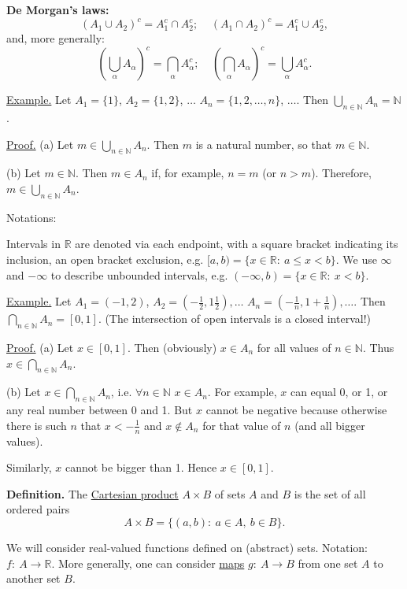 \documentclass[a4paper,10pt]{article}
\def\NN{\mathbb{N}}
\def\RR{\mathbb{R}}
\newcommand{\1}[1]{\mathbf{1}_{\{#1\}}}
\begin{document}
{\bf De Morgan's laws:}
  $$(A_1\cup A_2)^c=A^c_1\cap A^c_2;~~~~~(A_1\cap A_2)^c=A^c_1\cup A^c_2,$$
and, more generally:
  $$\left(\bigcup_\alpha A_\alpha\right)^c=\bigcap_\alpha A^c_\alpha;~~~~~\left(\bigcap_\alpha A_\alpha\right)^c=\bigcup_\alpha A^c_\alpha.$$\vspace{3mm}

\underline{Example.} Let $A_1=\{1\}$, $A_2=\{1,2\}$, $\ldots$ $A_n=\{1,2,\ldots, n\}$, $\ldots$. Then $\bigcup_{n\in\NN} A_n=\NN$.

\underline{Proof.} (a) Let $m\in \bigcup_{n\in\NN} A_n$. Then $m$ is a natural number, so that $m\in\NN$.

(b) Let $m\in\NN$. Then $m\in A_n$ if, for example, $n=m$ (or $n>m$). Therefore, $m\in\bigcup_{n\in\NN} A_n$. \blacksquare

Notations:

Intervals in $\RR$ are denoted via each endpoint, with a square bracket indicating its inclusion, an open bracket exclusion, e.g. $[a,b)=\{x\in \RR:~ a\le x<b\}$. We use $\infty$ and $-\infty$ to describe unbounded intervals, e.g. $(-\infty,b)=\{x\in\RR:~x<b\}$.\vspace{3mm}

\underline{Example.} Let $A_1=(-1,2)$, $A_2=(-\frac{1}{2}, 1\frac{1}{2}),\ldots$ $A_n=(-\frac{1}{n},1+\frac{1}{n}), \ldots$. Then $\bigcap _{n\in\NN} A_n=[0,1]$. (The intersection of open intervals is a closed interval!)

\underline{Proof.} (a) Let $x\in[0,1]$. Then (obviously) $x\in A_n$ for all values of $n\in\NN$. Thus $x\in\bigcap_{n\in\NN} A_n$.

(b) Let $x\in\bigcap_{n\in\NN} A_n$, i.e. $\forall n\in\NN$ $x\in A_n$. For example, $x$ can equal 0, or 1, or any real number between 0 and 1. But $x$ cannot be negative because otherwise there is such $n$ that $x<-\frac{1}{n}$ and $x\notin A_n$ for that value of $n$ (and all bigger values).

Similarly, $x$ cannot be bigger than 1. Hence $x\in[0,1]$. \blacksquare \vspace{3mm}

{\bf Definition.} The \underline{Cartesian product} $A\times B$ of sets $A$ and $B$ is the set of all ordered pairs
  $$A\times B=\{(a,b):~a\in A,~b\in B\}.$$\vspace{1mm}

We will consider real-valued functions defined on (abstract) sets. Notation: $f:~A\rightarrow \RR$. More generally, one can consider \underline{maps} $g:~A\rightarrow B$ from one set $A$ to another set $B$. \vspace{3mm}
\end{document}
